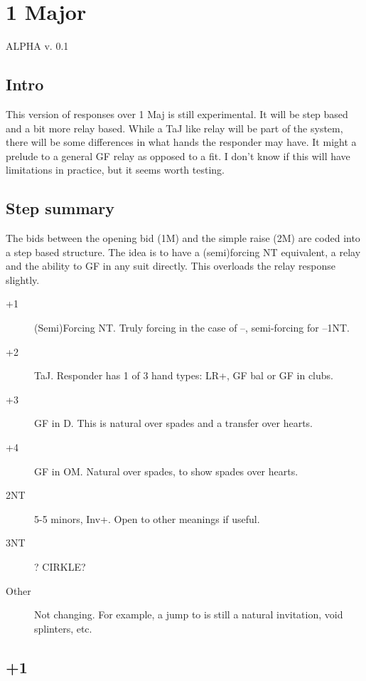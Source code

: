 \documentclass[tom-ari]{subfile}
\begin{document}
	
	\chapter{1 Major}
	
	\Huge{\color{red}ALPHA v. 0.1}
	
	\section{Intro}
	
	\normalsize 
	
	This version of responses over 1 Maj is still experimental.  It will be step based and a bit more relay based.  While a TaJ like relay will be part of the system, there will be some differences in what hands the responder may have.  It might a prelude to a general GF relay as opposed to a fit.  I don't know if this will have limitations in practice, but it seems worth testing.
	
	\section{Step summary} 
	
	The bids between the opening bid (1M) and the simple raise (2M) are coded into a step based structure.  The idea is to have a (semi)forcing NT equivalent, a relay and the ability to GF in any suit directly.  This overloads the relay response slightly.
	
	\begin{description}
		\item[+1] (Semi)Forcing NT.  Truly forcing in the case of --, semi-forcing for --1NT.
		\item[+2] TaJ.  Responder has 1 of 3 hand types: LR+, GF bal or GF in clubs.
		\item[+3] GF in D.  This is natural over spades and a transfer over hearts.
		\item[+4] GF in OM.  Natural over spades,  to show spades over hearts.
		\item[2NT] 5-5 minors, Inv+.  Open to other meanings if useful.
		\item[3NT] ?  CIRKLE?
		\item[Other] Not changing.  For example, a jump to  is still a natural invitation, void splinters, etc.
	\end{description}

	\section{+1}
	
\end{document}
